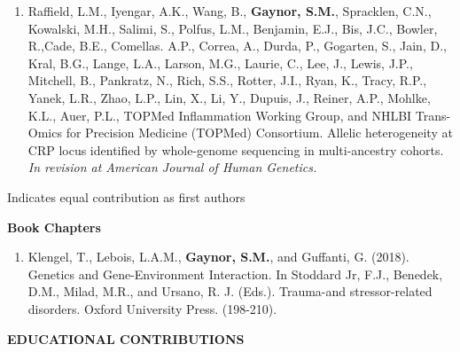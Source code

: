 \documentclass[10pt]{article}
\begin{document}
\begin{enumerate}
\item Raffield, L.M.,  Iyengar, A.K.,  Wang, B.,  \textbf{Gaynor, S.M.}, Spracklen, C.N., Kowalski, M.H., Salimi, S., Polfus, L.M., Benjamin, E.J., Bis, J.C., Bowler, R.,Cade, B.E., Comellas. A.P.,  Correa, A.,  Durda, P.,  Gogarten, S.,  Jain, D., Kral, B.G., Lange, L.A.,  Larson, M.G.,  Laurie, C., Lee, J., Lewis, J.P., Mitchell, B.,  Pankratz, N.,  Rich, S.S., Rotter, J.I., Ryan, K., Tracy, R.P., Yanek, L.R.,  Zhao, L.P., Lin, X., Li, Y., Dupuis, J., Reiner, A.P., Mohlke, K.L., Auer, P.L., TOPMed Inflammation Working Group, and NHLBI Trans-Omics for Precision Medicine (TOPMed) Consortium. Allelic heterogeneity at CRP locus identified by whole-genome sequencing in multi-ancestry cohorts. \textit{In revision at American Journal of Human Genetics.} \\
\end{enumerate}

\indent \indent  * Indicates equal contribution as first authors\\

\pagebreak

\indent \textbf{Book Chapters} \\
\begin{enumerate}
	\item Klengel, T., Lebois, L.A.M., \textbf{Gaynor, S.M.}, and Guffanti, G. (2018). Genetics and Gene-Environment Interaction. In Stoddard Jr, F.J.,
Benedek, D.M., Milad, M.R., and Ursano, R. J. (Eds.). Trauma-and stressor-related disorders. Oxford University Press. (198-210).\\
\end{enumerate}

\vspace{0.cm}

{\bf  EDUCATIONAL CONTRIBUTIONS} \hrulefill \\
\end{document}
